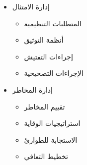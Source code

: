 \begin{itemize}
\begin{itemize}
        \item إدارة الامتثال
        \begin{itemize}
            \item المتطلبات التنظيمية
            \item أنظمة التوثيق
            \item إجراءات التفتيش
            \item الإجراءات التصحيحية
        \end{itemize}
        
        \item إدارة المخاطر
        \begin{itemize}
            \item تقييم المخاطر
            \item استراتيجيات الوقاية
            \item الاستجابة للطوارئ
            \item تخطيط التعافي
        \end{itemize}
    \end{itemize}
\end{itemize}

